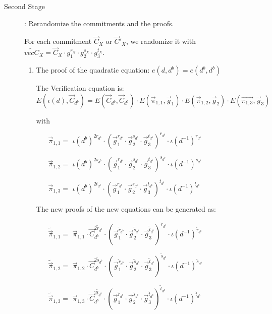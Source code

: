 \begin{description}
\begin{enumerate}
\begin{enumerate}
    \end{enumerate}

    
  \end{enumerate}

  
  
\item[Second Stage]: Rerandomize the commitments and the proofs.

  For each commitment $\vec{C}_{X}$ or $\vec{C}'_X$, we randomize it with $\tilde{vec{C}}_X = \vec{C}_X \cdot g_1^{r_X} \cdot g_2^{s_X} \cdot g_3^{t_X}$.
  \begin{enumerate}

  \item The proof of the quadratic equation: $e(d,\boxed{d^b}) = e(\boxed{d^b},\boxed{d^b})$
    
    The Verification equation is: $E(\iota(d), \vec{C}_{d^b}) = E(\vec{C}_{d^b}, \vec{C}_{d^b}) \cdot E(\vec{\pi}_{1,1}, \vec{g}_1)\cdot E(\vec{\pi}_{1,2}, \vec{g}_2)\cdot E(\vec{\pi_{1,3}}, \vec{g}_3)$

    with
    \begin{itemize}
    \item[$\vec{\pi}_{1,1} = $] $\iota(d^b)^{2r_{d^b}}\cdot (\vec{g}_1^{r_{d^b}} \cdot \vec{g}_2^{s_{d^b}} \cdot \vec{g}_3^{t_{d^b}})^{r_{d^b}} \cdot \iota(d^{-1})^{r_{d^b}}$
    \item[$\vec{\pi}_{1,2} = $] $\iota(d^b)^{2s_{d^b}}\cdot (\vec{g}_1^{r_{d^b}} \cdot \vec{g}_2^{s_{d^b}} \cdot \vec{g}_3^{t_{d^b}})^{s_{d^b}} \cdot \iota(d^{-1})^{s_{d^b}}$
    \item[$\vec{\pi}_{1,3} = $] $\iota(d^b)^{2t_{d^b}}\cdot (\vec{g}_1^{r_{d^b}} \cdot \vec{g}_2^{s_{d^b}} \cdot \vec{g}_3^{t_{d^b}})^{t_{d^b}} \cdot \iota(d^{-1})^{t_{d^b}}$
    \end{itemize}

    The new proofs of the new equations can be generated as:

    \begin{itemize}
    \item[$\tilde{\vec{\pi}}_{1,1} = $] $\vec{\pi}_{1,1} \cdot \vec{C}_{d^b}^{2\tilde{r}_{d^b}}\cdot (\vec{g}_1^{\tilde{r}_{d^b}} \cdot \vec{g}_2^{\tilde{s}_{d^b}} \cdot \vec{g}_3^{\tilde{t}_{d^b}})^{\tilde{r}_{d^b}} \cdot \iota(d^{-1})^{\tilde{r}_{d^b}}$
    \item[$\tilde{\vec{\pi}}_{1,2} = $] $\vec{\pi}_{1,2} \cdot \vec{C}_{d^b}^{2\tilde{s}_{d^b}}\cdot (\vec{g}_1^{\tilde{r}_{d^b}} \cdot \vec{g}_2^{\tilde{s}_{d^b}} \cdot \vec{g}_3^{\tilde{t}_{d^b}})^{\tilde{s}_{d^b}} \cdot \iota(d^{-1})^{\tilde{s}_{d^b}}$
    \item[$\tilde{\vec{\pi}}_{1,3} = $] $\vec{\pi}_{1,3} \cdot \vec{C}_{d^b}^{2\tilde{t}_{d^b}}\cdot (\vec{g}_1^{\tilde{r}_{d^b}} \cdot \vec{g}_2^{\tilde{s}_{d^b}} \cdot \vec{g}_3^{\tilde{t}_{d^b}})^{\tilde{t}_{d^b}} \cdot \iota(d^{-1})^{\tilde{t}_{d^b}}$
    \end{itemize}




\end{enumerate}
\end{description}
